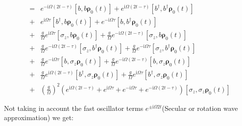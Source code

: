 \documentclass[reprint,aps,onecolumn,pra,notitlepage,nofootinbib]{revtex4-1}
\theoremstyle{definition}
\numberwithin{equation}{section}
\begin{document}
\begin{equation} 
\begin{align}
     &=& e^{-\mathrm{i} \Omega (2t-\tau)} \left[ b, b \boldsymbol{\rho}_{\mathrm{0}}(t)  \right]  + e^{\mathrm{i} \Omega (2t -\tau)} \left[ b^{\dagger}, b^{\dagger} \boldsymbol{\rho}_{\mathrm{0}}(t)  \right] \\
     &+& e^{\mathrm{i} \Omega \tau} \left[ b^{\dagger}, b \boldsymbol{\rho}_{\mathrm{0}}(t)  \right]  +  e^{- \mathrm{i} \Omega \tau} \left[ b, b^{\dagger}  \boldsymbol{\rho}_{\mathrm{0}}(t)  \right]   \\
     &+& \frac{g}{\Omega} e^{\mathrm{i} \Omega \tau} \left[ \sigma_z, b \boldsymbol{\rho}_{\mathrm{0}}(t)  \right]  + \frac{g}{\Omega} e^{- \mathrm{i} \Omega (2t- \tau)} \left[ \sigma_z, b \boldsymbol{\rho}_{\mathrm{0}}(t)  \right]  \\
     &+& \frac{g}{\Omega} e^{-\mathrm{i} \Omega (2t -\tau) } \left[ \sigma_z, b^{\dagger} \boldsymbol{\rho}_{\mathrm{0}}(t)  \right]  + \frac{g}{\Omega} e^{- \mathrm{i} \Omega  \tau} \left[ \sigma_z, b^{\dagger} \boldsymbol{\rho}_{\mathrm{0}}(t)  \right]  \\
     &+& \frac{g}{\Omega} e^{- \mathrm{i} \Omega \tau} \left[ b, \sigma_z \boldsymbol{\rho}_{\mathrm{0}}(t)  \right]  + \frac{g}{\Omega} e^{- \mathrm{i} \Omega (2t- \tau)} \left[ b, \sigma_z \boldsymbol{\rho}_{\mathrm{0}}(t)  \right] \\
     &+& \frac{g}{\Omega} e^{\mathrm{i} \Omega (2t-\tau) } \left[ b^{\dagger}, \sigma_z \boldsymbol{\rho}_{\mathrm{0}}(t)  \right]  + \frac{g}{\Omega} e^{ \mathrm{i} \Omega  \tau} \left[ b^{\dagger}, \sigma_z \boldsymbol{\rho}_{\mathrm{0}}(t)  \right]  \\
     &+& \left(\frac{g}{\Omega} \right)^2 \left( e^{\mathrm{i} \Omega (2t-\tau) } + e^{\mathrm{i} \Omega \tau} + e^{- \mathrm{i} \Omega \tau} + e^{-\mathrm{i} \Omega (2t-\tau) }\right) \left[ \sigma_z, \sigma_z \boldsymbol{\rho}_{\mathrm{0}}(t)  \right]
\end{align}
\end{equation}


Not taking in account the fast oscillator terms $e^{\pm  \mathrm{i} \Omega 2t }$(Secular or rotation wave approximation) we get: 
\end{document}
